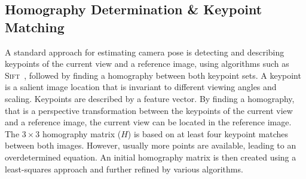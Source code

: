 \subsection{Homography Determination \& Keypoint Matching}
\label{sec:keypointmatching}

A standard approach for estimating camera pose is detecting and
describing keypoints of the current view and a reference image, using
algorithms such as \textsc{Sift}~\cite{lowe1999object}, followed by finding a homography between both keypoint sets. A
keypoint is a salient image location that is invariant to different
viewing angles and scaling. Keypoints are described by a feature vector. By finding a homography, that is a perspective transformation between the keypoints of the current view and a reference image, the current view can be located in the reference image. The $3 \times 3$
homography matrix ($H$) is based on at least four keypoint matches
between both images. However, usually more points are available,
leading to an overdetermined equation. An initial homography matrix is
then created using a least-squares approach and further refined by
various algorithms.

